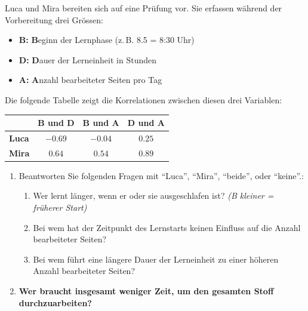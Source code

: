 \begin{myexercise}
	Luca und Mira bereiten sich auf eine Prüfung vor. Sie erfassen während der Vorbereitung drei Grössen:
	\begin{itemize}
		\item \textbf{B:} \textbf{B}eginn der Lernphase (z.\,B. 8.5 = 8:30 Uhr)
		\item \textbf{D:} \textbf{D}auer der Lerneinheit in Stunden
		\item \textbf{A:} \textbf{A}nzahl bearbeiteter Seiten pro Tag
	\end{itemize}
	Die folgende Tabelle zeigt die Korrelationen zwischen diesen drei Variablen:

	\begin{table}[H]
		\centering
		\begin{tabular}{l||c|c|c}

			              & \textbf{B und D} & \textbf{B und A} & \textbf{D und A} \\
			\midrule\midrule
			\textbf{Luca} & $-0.69$          & $-0.04$          & $0.25$           \\\midrule
			\textbf{Mira} & $0.64$           & $0.54$           & $0.89$           \\
		\end{tabular}
	\end{table}

	\begin{enumerate}
		\item Beantworten Sie folgenden Fragen mit \enquote{Luca}, \enquote{Mira}, \enquote{beide}, oder \enquote{keine}.:
		      \begin{enumerate}
			      \item Wer lernt länger, wenn er oder sie ausgeschlafen ist? \hfill \textit{(B kleiner = früherer Start)}
			      \item Bei wem hat der Zeitpunkt des Lernstarts keinen Einfluss auf die Anzahl bearbeiteter Seiten?
			      \item Bei wem führt eine längere Dauer der Lerneinheit zu einer höheren Anzahl bearbeiteter Seiten?
		      \end{enumerate}
		\item \textbf{Wer braucht insgesamt weniger Zeit, um den gesamten Stoff durchzuarbeiten?}
	\end{enumerate}


\end{myexercise}
